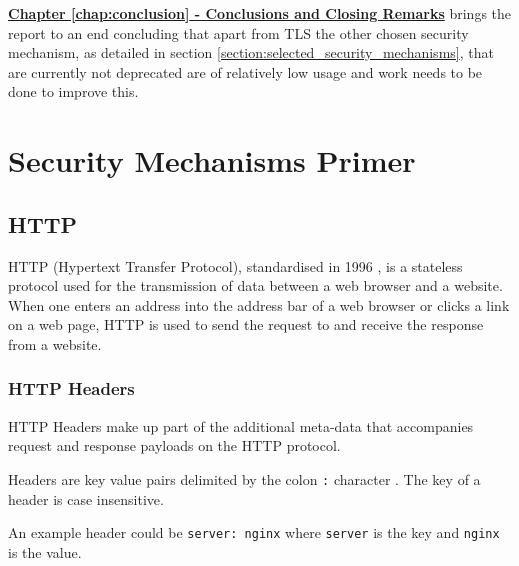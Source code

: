 \documentclass{mscreport}
\begin{document}
\vspace{0.3cm} \noindent
\hyperref[chap:conclusion]{\textbf{Chapter \ref{chap:conclusion} - Conclusions and Closing Remarks}} brings the report to an end concluding that apart from TLS the other chosen security mechanism, as detailed in section \ref{section:selected_security_mechanisms}, that are currently not deprecated are of relatively low usage and work needs to be done to improve this.

\newpage

%

\chapter{Security Mechanisms Primer}
\label{chap:sec_feat_primer}

\section{HTTP}
\label{section:http}

HTTP (Hypertext Transfer Protocol), standardised in 1996 \cite{Berners-Lee1996-ji}, is a stateless protocol used for the transmission of data between a web browser and a website. When one enters an address into the address bar of a web browser or clicks a link on a web page, HTTP is used to send the request to and receive the response from a website.

\subsection{HTTP Headers}

\noindent HTTP Headers make up part of the additional meta-data that accompanies request and response payloads on the HTTP protocol.

\vspace{0.3cm} \noindent
Headers are key value pairs delimited by the colon \texttt{:} character \cite{Berners-Lee1996-ji}. The key of a header is case insensitive.

\vspace{0.3cm} \noindent
An example header could be \texttt{server: nginx} where \texttt{server} is the key and \texttt{nginx} is the value.
\end{document}
